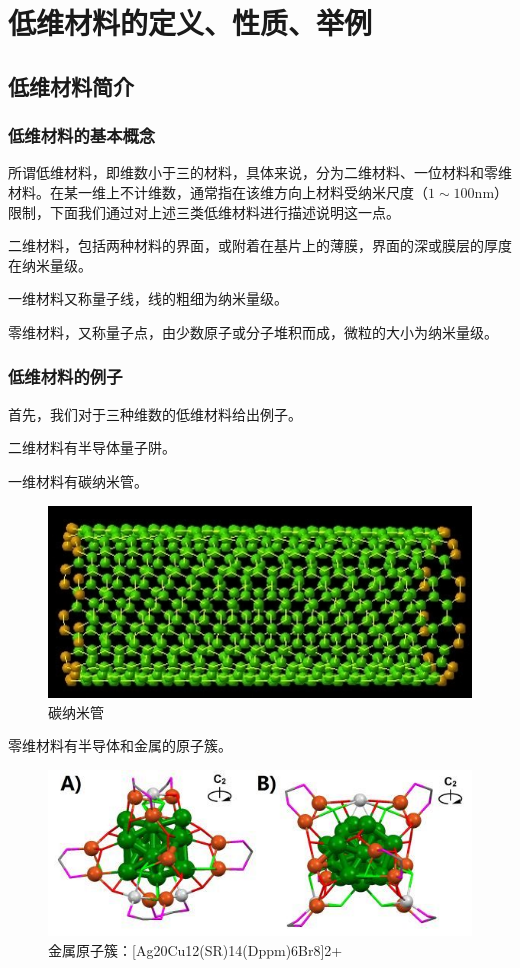 
\chapter{低维材料的定义、性质、举例}
\section{低维材料简介}

\subsection{低维材料的基本概念}

所谓低维材料，即维数小于三的材料，具体来说，分为二维材料、一位材料和零维材料。在某一维上不计维数，通常指在该维方向上材料受纳米尺度（$1\sim 100\si{\nano\meter}$）限制，下面我们通过对上述三类低维材料进行描述说明这一点。

二维材料，包括两种材料的界面，或附着在基片上的薄膜，界面的深或膜层的厚度在纳米量级。

一维材料又称量子线，线的粗细为纳米量级。

零维材料，又称量子点，由少数原子或分子堆积而成，微粒的大小为纳米量级。

\subsection{低维材料的例子}

首先，我们对于三种维数的低维材料给出例子。

二维材料有半导体量子阱。

一维材料有碳纳米管。

\begin{figure}
    \centering
    \includegraphics[scale=0.7]{img/碳纳米管}
    \caption{碳纳米管}
\end{figure}

零维材料有半导体和金属的原子簇。

\begin{figure}
    \centering
    \includegraphics{img/金属原子簇}
    \caption{金属原子簇：[Ag20Cu12(SR)14(Dppm)6Br8]2+}
\end{figure}

